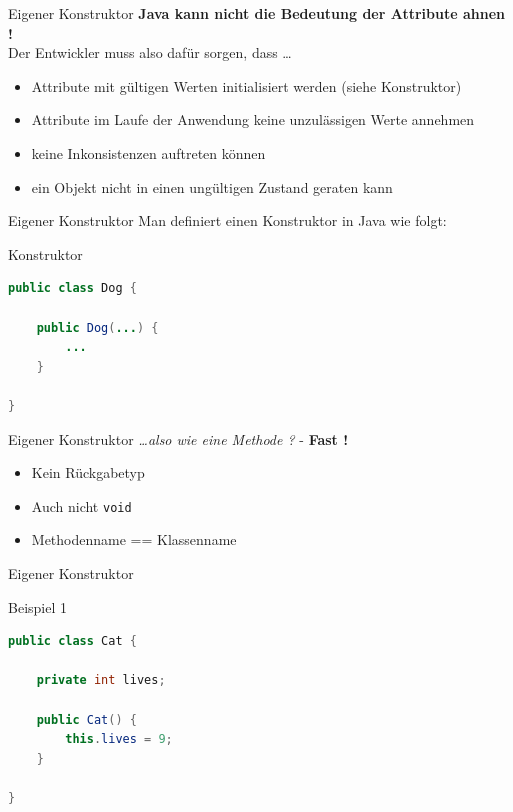 \documentclass[18pt]{beamer}
\begin{document}
\begin{frame}{Eigener Konstruktor}
    \textbf{Java kann nicht die Bedeutung der Attribute ahnen !}\\
    \vspace{.5in}
    \pause
    Der Entwickler muss also dafür sorgen, dass \dots
    \begin{itemize}
        \item Attribute mit gültigen Werten initialisiert werden (siehe Konstruktor)
        \item Attribute im Laufe der Anwendung keine unzulässigen Werte annehmen
        \item keine Inkonsistenzen auftreten können
        \item ein Objekt nicht in einen ungültigen Zustand geraten kann
    \end{itemize}
\end{frame}

\begin{frame}[fragile]{Eigener Konstruktor}
    Man definiert einen Konstruktor in Java wie folgt:
    \begin{exampleblock}{Konstruktor}
        \begin{lstlisting}[language=Java]
public class Dog {

    public Dog(...) {
        ...
    }

}
        \end{lstlisting}

    \end{exampleblock}

\end{frame}

\begin{frame}{Eigener Konstruktor}
    \textit{\dots also wie eine Methode ?} - \textbf{Fast !}
    \begin{itemize}
        \item Kein Rückgabetyp
        \item Auch nicht \texttt{void}
        \item Methodenname == Klassenname
    \end{itemize}
\end{frame}

\begin{frame}[fragile]{Eigener Konstruktor}
    \begin{exampleblock}{Beispiel 1}
        \begin{lstlisting}[language=Java]
public class Cat {

    private int lives;

    public Cat() {
        this.lives = 9;
    }

}
        \end{lstlisting}

    \end{exampleblock}

\end{frame}
\end{document}
